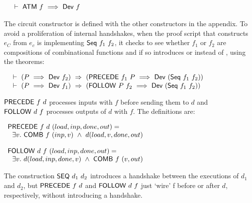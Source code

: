 \vspace*{-4mm}
$$\begin{array}{l}
~\vdash\ \mathsf{ATM}\ f\ \Longrightarrow \  \mathsf{Dev}\ f\\
\phantom{~~~~~~~~~~~~~~~~~~~~~~~~~~~~~~~~~~~~~~~~~~~~~~~~~~~~~~~~~~~~~~~~~~~~~~~~~~~~~~~~~~~~~~~~~~~~~~~~~~~~~}\\[-4mm]
\end{array}$$

\noindent The circuit constructor  is defined with the other constructors in the appendix.
To avoid a proliferation  of internal handshakes, when the proof script that constructs $e_C$ from $e_c$ 
is implementing $\mathsf{Seq}~f_1~f_2$, it checks to see whether $f_1$ or $f_2$ 
are compositions of combinational functions and if so introduces  or  instead of ,
using the theorems:

\vspace*{-4mm}
$$\begin{array}{l}
~\vdash\
      (P\ \Longrightarrow\ \mathsf{Dev}~f_2)~\Rightarrow~(\mathsf{PRECEDE}~f_1~P\ \Longrightarrow\ \mathsf{Dev}\ (\mathsf{Seq}~f_1~f_2))\\
\phantom{~~~~~~~~~~~~~~~~~~~~~~~~~~~~~~~~~~~~~~~~~~~~~~~~~~~~~~~~~~~~~~~~~~~~~~~~~~~~~~~~~~~~~~~~~~~~~~~~~~~~~~}\\[-4mm]
~\vdash\
(P\ \Longrightarrow\ \mathsf{Dev}~f_1)~\Rightarrow~(\mathsf{FOLLOW}~P~f_2\  \Longrightarrow\ \mathsf{Dev}\ (\mathsf{Seq}~f_1~f_2))\\
\end{array}$$


\noindent $\mathsf{PRECEDE}~f~d$ processes inputs with $f$ before sending them to $d$ and
$\mathsf{FOLLOW}~d~f$ processes outputs of $d$ with
$f$. The definitions are:

\vspace*{3mm}

$\begin{array}{l}
\mathsf{PRECEDE}~f~d~(load,inp,done,out)  =\\
~~ \exists v.~ \mathsf{COMB}~f~(inp,v) ~\wedge~ d(load,v,done,out)\\
 \\
\mathsf{FOLLOW}~d~f~ (load,inp,done,out)  =\\
~~ \exists v.~d(load,inp,done,v) ~\wedge~ \mathsf{COMB}~f~(v,out)
\end{array}$
\vspace*{3mm}

The construction $\mathsf{SEQ}~d_1~d_2$ introduces a handshake between the executions
of $d_1$ and $d_2$, but $\mathsf{PRECEDE}~f~d$ and $\mathsf{FOLLOW}~d~f$
just `wire' f before or after $d$, respectively, without introducing a
handshake. 

